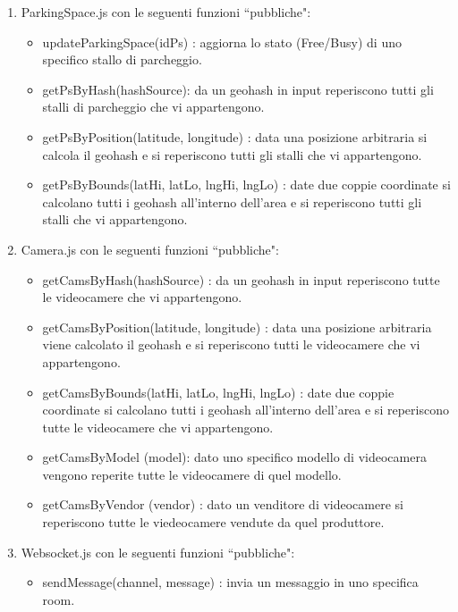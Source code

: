 \begin{enumerate}
	\item ParkingSpace.js con le seguenti funzioni ``pubbliche":
	\begin{itemize}
			\item updateParkingSpace(idPs) : aggiorna lo stato (Free/Busy) di uno specifico stallo di parcheggio.
			\item getPsByHash(hashSource): da un geohash in input reperiscono tutti gli stalli di parcheggio che vi appartengono.
			\item getPsByPosition(latitude, longitude) : data una posizione arbitraria si calcola il geohash e si reperiscono tutti gli stalli che vi appartengono.
			\item getPsByBounds(latHi, latLo, lngHi, lngLo) : date due coppie coordinate si calcolano tutti i geohash all'interno dell'area e si reperiscono tutti gli stalli che vi appartengono.
		\end{itemize}

	\item Camera.js con le seguenti funzioni ``pubbliche":
	\begin{itemize}
			\item getCamsByHash(hashSource) : da un geohash in input reperiscono tutte le videocamere che vi appartengono.
			\item getCamsByPosition(latitude, longitude) : data una posizione arbitraria viene calcolato il geohash e si reperiscono tutti le videocamere che vi appartengono.
			\item getCamsByBounds(latHi, latLo, lngHi, lngLo) : date due coppie coordinate si calcolano tutti i geohash all'interno dell'area e si reperiscono tutte le videocamere che vi appartengono.
			\item getCamsByModel (model): dato uno specifico modello di videocamera vengono reperite tutte le videocamere di quel modello.
			\item getCamsByVendor (vendor) : dato un venditore di videocamere si reperiscono tutte le viedeocamere vendute da quel produttore.
	\end{itemize}

	\item Websocket.js con le seguenti funzioni ``pubbliche":
	\begin{itemize}
		\item sendMessage(channel, message) : invia un messaggio in uno specifica room.
	\end{itemize}
\end{enumerate}

